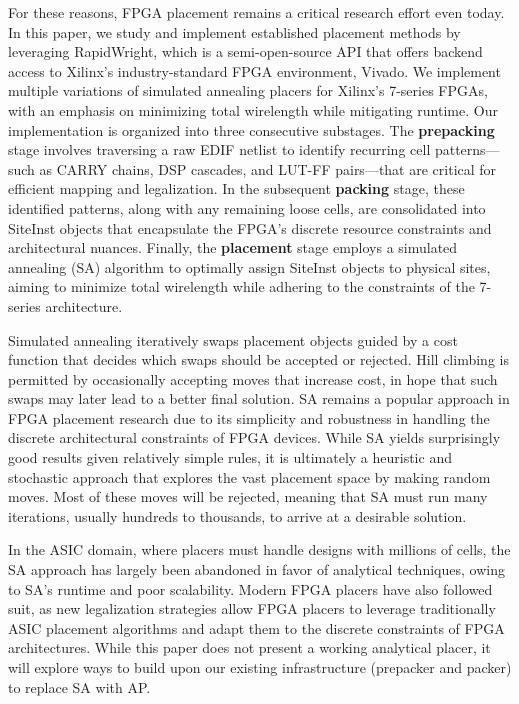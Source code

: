 \documentclass[twocolumn]{article}
\begin{document}
    For these reasons, FPGA placement remains a critical research effort even today. 
    In this paper, we study and implement established placement methods by leveraging RapidWright, which is a semi-open-source API that offers backend access to Xilinx's industry-standard FPGA environment, Vivado. 
    We implement multiple variations of simulated annealing placers for Xilinx's 7-series FPGAs, with an emphasis on minimizing total wirelength while mitigating runtime. 
    Our implementation is organized into three consecutive substages. 
    The \textbf{prepacking} stage involves traversing a raw EDIF netlist to identify recurring cell patterns—such as CARRY chains, DSP cascades, and LUT-FF pairs—that are critical for efficient mapping and legalization. 
    In the subsequent \textbf{packing} stage, these identified patterns, along with any remaining loose cells, are consolidated into SiteInst objects that encapsulate the FPGA’s discrete resource constraints and architectural nuances. 
    Finally, the \textbf{placement} stage employs a simulated annealing (SA) algorithm to optimally assign SiteInst objects to physical sites, aiming to minimize total wirelength while adhering to the constraints of the 7-series architecture. 

    Simulated annealing iteratively swaps placement objects guided by a cost function that decides which swaps should be accepted or rejected. 
    Hill climbing is permitted by occasionally accepting moves that increase cost, in hope that such swaps may later lead to a better final solution. 
    SA remains a popular approach in FPGA placement research due to its simplicity and robustness in handling the discrete architectural constraints of FPGA devices. 
    While SA yields surprisingly good results given relatively simple rules, it is ultimately a heuristic and stochastic approach that explores the vast placement space by making random moves. 
    Most of these moves will be rejected, meaning that SA must run many iterations, usually hundreds to thousands, to arrive at a desirable solution. 

    In the ASIC domain, where placers must handle designs with millions of cells, the SA approach has largely been abandoned in favor of analytical techniques, owing to SA's runtime and poor scalability. 
    Modern FPGA placers have also followed suit, as new legalization strategies allow FPGA placers to leverage traditionally ASIC placement algorithms and adapt them to the discrete constraints of FPGA architectures. 
    While this paper does not present a working analytical placer, it will explore ways to build upon our existing infrastructure (prepacker and packer) to replace SA with AP. 
\end{document}
